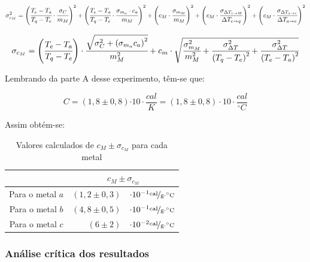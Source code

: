 \documentclass[a4paper]{article}
\providecommand{\tabularnewline}{\\}
\begin{document}
				\[
					\sigma_{c_{M}}^{2}=
						\left(\cfrac{T_{e}-T_{a}}{T_{q}-T_{e}}\cdot\cfrac{\sigma_{C}}{m_{M}}\right)^{2}+
						\left(\cfrac{T_{e}-T_{a}}{T_{q}-T_{e}}\cdot\cfrac{\sigma_{m_{a}}\cdot c_{a}}{m_{M}}\right)^{2}+
						\left(c_{M}\cdot\cfrac{\sigma_{m_{M}}}{m_{M}}\right)^{2}+
						\left(c_{M}\cdot\cfrac{\sigma_{\Delta T_{e\rightarrow M}}}{\Delta T_{e\rightarrow q}}\right)^{2}+
						\left(c_{M}\cdot\cfrac{\sigma_{\Delta T_{a\rightarrow e}}}{\Delta T_{a\rightarrow e}}\right)^{2}
				\]


				\begin{equation}
					\sigma_{c_{M}}=
						\left(\cfrac{T_{e}-T_{a}}{T_{q}-T_{e}}\right)\cdot\cfrac{\sqrt{\sigma_{C}^{2}+
						\left(\sigma_{m_{a}}c_{a}\right)^{2}}}{m_{M}^{2}}+c_{m}\cdot\sqrt{\cfrac{\sigma_{m_{M}}^{2}}{m_{M}^{2}}+\cfrac{\sigma_{\Delta T}^{2}}{
						\left(T_{q}-T_{e}\right)^{2}}+\cfrac{\sigma_{\Delta T}^{2}}{
						\left(T_{e}-T_{a}\right)^{2}}}
				\end{equation}


				Lembrando da parte A desse experimento, têm-se que:

				\begin{equation}
					C=\left(1,8\pm0,8\right)\unit{\cdot10\cdot\frac{cal}{K}=\left(1,8\pm0,8\right)\cdot10\cdot}\frac{cal}{^{\circ}C}
				\end{equation}


				Assim obtém-se:

				\begin{table}[!ht]
					\caption{Valores calculados de $c_{M}\pm\sigma_{c_{M}}$ para cada metal}


					\centering{}%
					\begin{tabular}{|c|rl|}
						\cline{2-3} 
						\multicolumn{1}{c|}{} & \multicolumn{2}{c|}{$c_{M}\pm\sigma_{c_{M}}$}\tabularnewline
						\hline 
						Para o metal $a$  & $\left(1,2\pm0,3\right)$  & 
						$\cdot10^{-1}\unitfrac{cal}{g\cdot^{\circ}C}$\tabularnewline
						\hline 
						Para o metal $b$  & $\left(4,8\pm0,5\right)$  & 
						$\cdot10^{-1}\unitfrac{cal}{g\cdot^{\circ}C}$\tabularnewline
						\hline 
						Para o metal $c$  & $\left(6\pm2\right)$  & 
						$\cdot10^{-2}\unitfrac{cal}{g\cdot^{\circ}C}$\tabularnewline
						\hline 
					\end{tabular}
				\end{table}

			\subsubsection{Análise crítica dos resultados}
\end{document}
